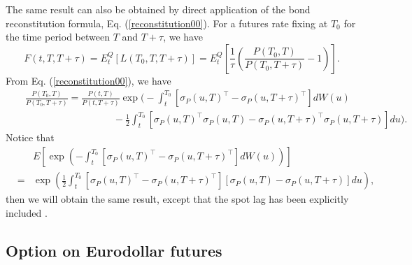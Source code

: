 \documentclass[12pt]{article}
\begin{document}
    The same result can also be obtained by direct application of the bond reconstitution formula, Eq. (\ref{reconstitution00}).
    For a futures rate fixing at $T_0$ for the time period between $T$ and $T+\tau$, we have
    \begin{equation}
      F(t,T,T+\tau)=E_t^Q\left[L(T_0,T,T+\tau)\right]=E_t^Q\left[\frac{1}{\tau}\left(\frac{P(T_0,T)}{P(T_0,T+\tau)}-1\right)\right].
    \end{equation}
    From Eq. (\ref{reconstitution00}), we have
    \begin{eqnarray}
      &&\frac{P(T_0,T)}{P(T_0,T+\tau)}=\frac{P(t,T)}{P(t,T+\tau)}\exp\Bigg(-\int_t^{T_0}\left[\sigma_P(u,T)^{\top}-\sigma_P(u,T+\tau)^{\top}\right]dW(u)\nonumber\\
      &&\quad\quad\quad\quad\quad\quad\quad\quad\quad
            -\frac{1}{2}\int_t^{T_0}\left[\sigma_P(u,T)^{\top}\sigma_P(u,T)-\sigma_P(u,T+\tau)^{\top}\sigma_P(u,T+\tau)\right]du\Bigg).
    \end{eqnarray}
    Notice that
    \begin{eqnarray}
      &&E\left[\exp\left(-\int_t^{T_0}\left[\sigma_P(u,T)^{\top}-\sigma_P(u,T+\tau)^{\top}\right]dW(u)\right)\right]\nonumber\\
      &=&\exp\left(\frac{1}{2}\int_t^{T_0}\left[\sigma_P(u,T)^{\top}-\sigma_P(u,T+\tau)^{\top}\right]
                                      \left[\sigma_P(u,T)-\sigma_P(u,T+\tau)\right]du\right),\nonumber
    \end{eqnarray}
    then we will obtain the same result, except that the spot lag has been explicitly included \cite{MH}.

  \subsection{Option on Eurodollar futures}
\end{document}
